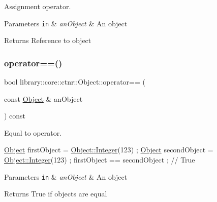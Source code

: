 Assignment operator. 


\begin{DoxyParams}[1]{Parameters}
\mbox{\tt in}  & {\em an\+Object} & An object \\
\hline
\end{DoxyParams}
\begin{DoxyReturn}{Returns}
Reference to object 
\end{DoxyReturn}
\mbox{\label{classlibrary_1_1core_1_1ctnr_1_1_object_a543801cb9c7c22432603aca5435595e9}} 
\subsubsection{\texorpdfstring{operator==()}{operator==()}}
{\footnotesize\ttfamily bool library\+::core\+::ctnr\+::\+Object\+::operator== (\begin{DoxyParamCaption}\item[{const \hyperlink{classlibrary_1_1core_1_1ctnr_1_1_object}{Object} \&}]{an\+Object }\end{DoxyParamCaption}) const}



Equal to operator. 


\begin{DoxyCode}
\hyperlink{classlibrary_1_1core_1_1ctnr_1_1_object_a51bb72dec3a1b2738e0ad92b977b8d8d}{Object} firstObject = \hyperlink{classlibrary_1_1core_1_1ctnr_1_1_object_a8a8b1ef718d092c154011cf5c37373bb}{Object::Integer}(123) ;
\hyperlink{classlibrary_1_1core_1_1ctnr_1_1_object_a51bb72dec3a1b2738e0ad92b977b8d8d}{Object} secondObject = \hyperlink{classlibrary_1_1core_1_1ctnr_1_1_object_a8a8b1ef718d092c154011cf5c37373bb}{Object::Integer}(123) ;
firstObject == secondObject ; \textcolor{comment}{// True}
\end{DoxyCode}



\begin{DoxyParams}[1]{Parameters}
\mbox{\tt in}  & {\em an\+Object} & An object \\
\hline
\end{DoxyParams}
\begin{DoxyReturn}{Returns}
True if objects are equal 
\end{DoxyReturn}
\mbox{\label{classlibrary_1_1core_1_1ctnr_1_1_object_a376782120a993c568de4388f642a6544}} 
